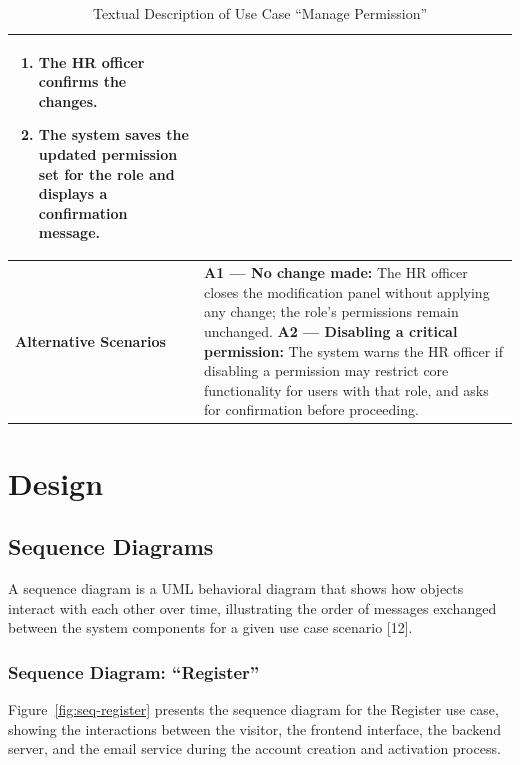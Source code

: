 \begin{table}[H]
\begin{tabularx}{\textwidth}{|>{\bfseries\arraybackslash}p{4cm}|X|}
\begin{enumerate}[leftmargin=*, label=\arabic*., topsep=0pt, itemsep=0pt]
    \item The HR officer confirms the changes.
    \item The system saves the updated permission set for the role and displays a confirmation message.
\end{enumerate} \\
\hline
Alternative Scenarios &
\textbf{A1 --- No change made:} The HR officer closes the modification panel without applying any change; the role's permissions remain unchanged. \newline
\textbf{A2 --- Disabling a critical permission:} The system warns the HR officer if disabling a permission may restrict core functionality for users with that role, and asks for confirmation before proceeding. \\
\hline
\end{tabularx}
\caption{Textual Description of Use Case ``Manage Permission''}
\label{tab:uc-permission}
\end{table}
\normalsize
\setlength{\tabcolsep}{6pt}
\renewcommand{\arraystretch}{1}

\section{Design}

\subsection{Sequence Diagrams}

A sequence diagram is a UML behavioral diagram that shows how objects interact with each other over time, illustrating the order of messages exchanged between the system components for a given use case scenario [12].

\subsubsection{Sequence Diagram: ``Register''}

Figure~\ref{fig:seq-register} presents the sequence diagram for the Register use case, showing the interactions between the visitor, the frontend interface, the backend server, and the email service during the account creation and activation process.

